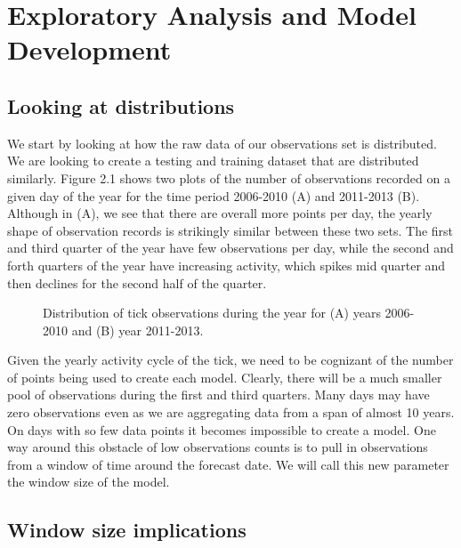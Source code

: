 
\chapter{Exploratory Analysis and Model Development} %

\label{Chapter2} %


\section{Looking at distributions }

We start by looking at how the raw data of our observations set is distributed. We are looking to create a testing and training dataset that are distributed similarly. Figure 2.1 shows two plots of the number of observations recorded on a given day of the year for the time period 2006-2010 (A) and 2011-2013 (B). Although in (A), we see that there are overall more points per day, the yearly shape of observation records is strikingly similar between these two sets. The first and third quarter of the year have few observations per day, while the second and forth quarters of the year have increasing activity, which spikes mid quarter and then declines for the second half of the quarter. 

\begin{figure} [!ht]
\centerline{}
\caption{Distribution of tick observations during the year for (A) years 2006-2010 and (B) year 2011-2013. }
\label{fig6}
\end{figure}


\noindent Given the yearly activity cycle of the tick, we need to be cognizant of the number of points being used to create each model. Clearly, there will be a much smaller pool of observations during the first and third quarters. Many days may have zero observations even as we are aggregating data from a span of almost 10 years. On days with so few data points it becomes impossible to create a model. One way around this obstacle of low observations counts is to pull in observations from a window of time around the forecast date. We will call this new parameter the window size of the model. \newline

\section{Window size implications }

